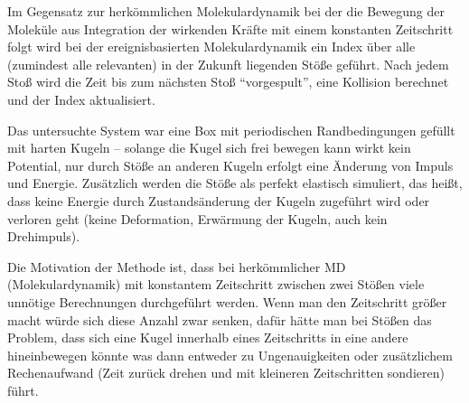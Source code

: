 Im Gegensatz zur herkömmlichen Molekulardynamik bei der die Bewegung der Moleküle aus Integration der wirkenden Kräfte mit einem konstanten Zeitschritt folgt wird bei der ereignisbasierten Molekulardynamik ein Index über alle (zumindest alle relevanten) in der Zukunft liegenden Stöße geführt. Nach jedem Stoß wird die Zeit bis zum nächsten Stoß ``vorgespult'', eine Kollision berechnet und der Index aktualisiert.

Das untersuchte System war eine Box mit periodischen Randbedingungen gefüllt mit harten Kugeln -- solange die Kugel sich frei bewegen kann wirkt kein Potential, nur durch Stöße an anderen Kugeln erfolgt eine Änderung von Impuls und Energie. Zusätzlich werden die Stöße als perfekt elastisch simuliert, das heißt, dass keine Energie durch Zustandsänderung der Kugeln zugeführt wird oder verloren geht (keine Deformation, Erwärmung der Kugeln, auch kein Drehimpuls). 

Die Motivation der Methode ist, dass bei herkömmlicher MD (Molekulardynamik) mit konstantem Zeitschritt zwischen zwei Stößen viele unnötige Berechnungen durchgeführt werden. Wenn man den Zeitschritt größer macht würde sich diese Anzahl zwar senken, dafür hätte man bei Stößen das Problem, dass sich eine Kugel innerhalb eines Zeitschritts in eine andere hineinbewegen könnte was dann entweder zu Ungenauigkeiten oder zusätzlichem Rechenaufwand (Zeit zurück drehen und mit kleineren Zeitschritten sondieren) führt.